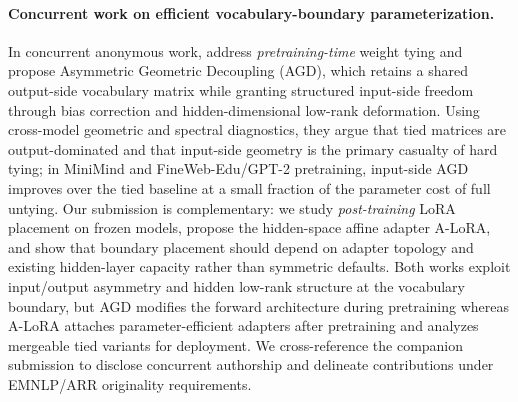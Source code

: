 
\paragraph{Concurrent work on efficient vocabulary-boundary parameterization.}
In concurrent anonymous work, \citet{Anonymous2026a} address \emph{pretraining-time} weight tying and propose Asymmetric Geometric Decoupling (AGD), which retains a shared output-side vocabulary matrix while granting structured input-side freedom through bias correction and hidden-dimensional low-rank deformation.
Using cross-model geometric and spectral diagnostics, they argue that tied matrices are output-dominated and that input-side geometry is the primary casualty of hard tying; in MiniMind and FineWeb-Edu/GPT-2 pretraining, input-side AGD improves over the tied baseline at a small fraction of the parameter cost of full untying.
Our submission is complementary: we study \emph{post-training} LoRA placement on frozen models, propose the hidden-space affine adapter A-LoRA, and show that boundary placement should depend on adapter topology and existing hidden-layer capacity rather than symmetric defaults.
Both works exploit input/output asymmetry and hidden low-rank structure at the vocabulary boundary, but AGD modifies the forward architecture during pretraining whereas A-LoRA attaches parameter-efficient adapters after pretraining and analyzes mergeable tied variants for deployment.
We cross-reference the companion submission to disclose concurrent authorship and delineate contributions under EMNLP/ARR originality requirements.
